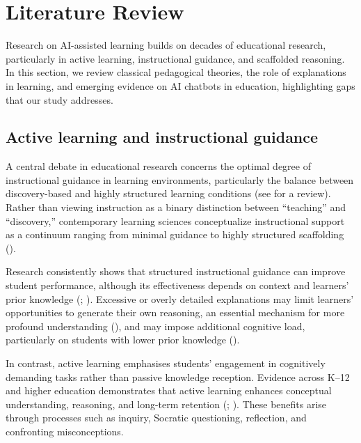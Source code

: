 \documentclass[
  11pt,
]{article}
\begin{document}
\section{Literature Review}\label{literature-review}

Research on AI-assisted learning builds on decades of educational research, particularly in active learning, instructional guidance, and scaffolded reasoning. In this section, we review classical pedagogical theories, the role of explanations in learning, and emerging evidence on AI chatbots in education, highlighting gaps that our study addresses.

\subsection{Active learning and instructional guidance}\label{active-learning-and-instructional-guidance}

A central debate in educational research concerns the optimal degree of instructional guidance in learning environments, particularly the balance between discovery-based and highly structured learning conditions (see  for a review). Rather than viewing instruction as a binary distinction between ``teaching'' and ``discovery,'' contemporary learning sciences conceptualize instructional support as a continuum ranging from minimal guidance to highly structured scaffolding ().

Research consistently shows that structured instructional guidance can improve student performance, although its effectiveness depends on context and learners' prior knowledge (; ). Excessive or overly detailed explanations may limit learners' opportunities to generate their own reasoning, an essential mechanism for more profound understanding (), and may impose additional cognitive load, particularly on students with lower prior knowledge ().

In contrast, active learning emphasises students' engagement in cognitively demanding tasks rather than passive knowledge reception. Evidence across K--12 and higher education demonstrates that active learning enhances conceptual understanding, reasoning, and long-term retention (; ). These benefits arise through processes such as inquiry, Socratic questioning, reflection, and confronting misconceptions.
\end{document}
